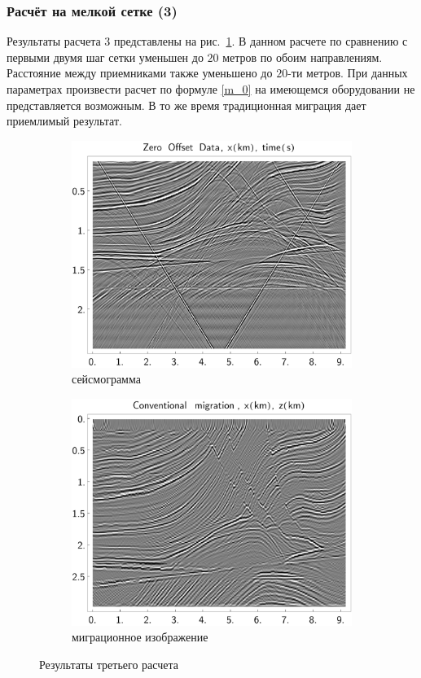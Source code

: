 \documentclass{article}
\newcommand  {\figref  } [1]     {рис.~\ref{#1}}
\begin{document}
\subsubsection{Расчёт на мелкой сетке (3)}
Результаты расчета 3 представлены на \figref{marmresult3}. В данном расчете по сравнению с первыми двумя шаг сетки уменьшен до $20$ метров по обоим направлениям. Расстояние между приемниками также уменьшено до $20$-ти метров. При данных параметрах произвести расчет по формуле \eqref{m_0} на имеющемся оборудовании не представляется возможным. В то же время традиционная миграция дает приемлимый результат.
%
\begin{figure}[tb]
\centering
\begin{subfigure}{.5\textwidth}\includegraphics[width=\textwidth]{pic/report_april/zo_seism_good_norm}\caption{сейсмограмма}\end{subfigure}%
\begin{subfigure}{.5\textwidth}\includegraphics[width=\textwidth]{pic/report_april/zo_migr_good_norm}\caption{миграционное изображение}\end{subfigure}%
\caption{Результаты третьего расчета} \label{marmresult3}
\end{figure}
\end{document}
